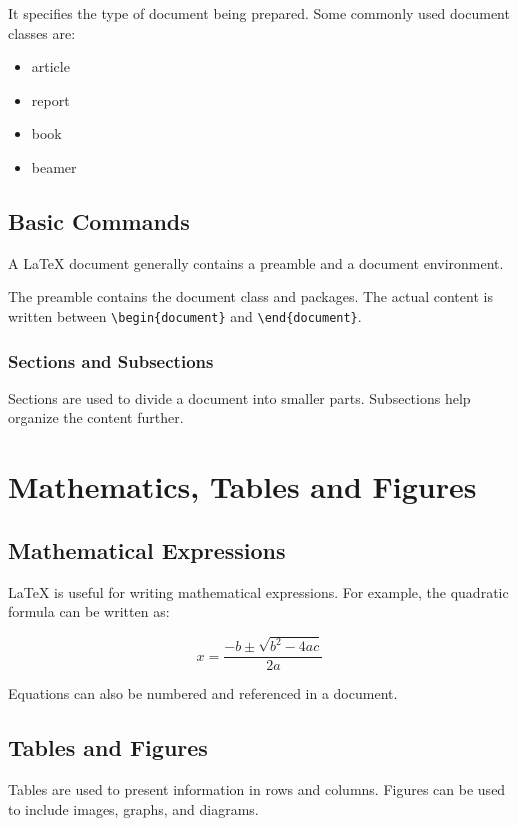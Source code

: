 \documentclass[12pt,a4paper]{report}
\begin{document}
	It specifies the type of document being prepared.
	Some commonly used document classes are:
	
	\begin{itemize}
		\item article
		\item report
		\item book
		\item beamer
	\end{itemize}
	
	\section{Basic Commands}
	
	A LaTeX document generally contains a preamble and
	a document environment.
	
	The preamble contains the document class and packages.
	The actual content is written between
	\texttt{\textbackslash begin\{document\}} and
	\texttt{\textbackslash end\{document\}}.
	
	\subsection{Sections and Subsections}
	
	Sections are used to divide a document into smaller
	parts. Subsections help organize the content further.
	
	\chapter{Mathematics, Tables and Figures}
	
	\section{Mathematical Expressions}
	
	LaTeX is useful for writing mathematical expressions.
	For example, the quadratic formula can be written as:
	
	\[
	x = \frac{-b \pm \sqrt{b^2-4ac}}{2a}
	\]
	
	Equations can also be numbered and referenced in
	a document.
	
	\section{Tables and Figures}
	
	Tables are used to present information in rows and
	columns. Figures can be used to include images,
	graphs, and diagrams.
	
\end{document}
